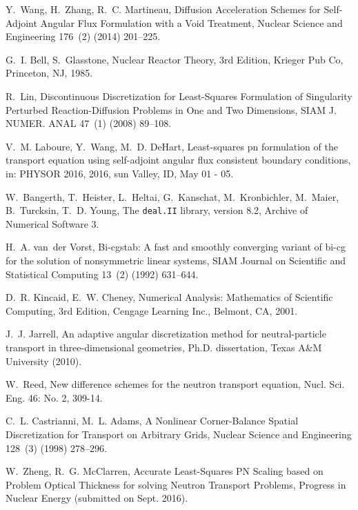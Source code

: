\documentclass[review]{elsarticle}
\begin{document}
\begin{thebibliography}{10}
	Y.~Wang, H.~Zhang, R.~C. Martineau, {Diffusion Acceleration Schemes for
		Self-Adjoint Angular Flux Formulation with a Void Treatment}, Nuclear Science
	and Engineering 176~(2) (2014) 201--225.
	
	G.~I. Bell, S.~Glasstone, Nuclear Reactor Theory, 3rd Edition, Krieger Pub Co,
	Princeton, NJ, 1985.
	
	R.~Lin, {Discontinuous Discretization for Least-Squares Formulation of
		Singularity Perturbed Reaction-Diffusion Problems in One and Two Dimensions},
	SIAM J. NUMER. ANAL 47~(1) (2008) 89--108.
	
	V.~M. Laboure, Y.~Wang, M.~D. DeHart, Least-squares pn formulation of the
	transport equation using self-adjoint angular flux consistent boundary
	conditions, in: {PHYSOR 2016}, 2016, sun Valley, ID, May 01 - 05.
	
	W.~Bangerth, T.~Heister, L.~Heltai, G.~Kanschat, M.~Kronbichler, M.~Maier,
	B.~Turcksin, T.~D. Young, The \texttt{deal.II} library, version 8.2, Archive
	of Numerical Software 3.
	
	H.~A. van~der Vorst, Bi-cgstab: A fast and smoothly converging variant of bi-cg
	for the solution of nonsymmetric linear systems, SIAM Journal on Scientific
	and Statistical Computing 13~(2) (1992) 631--644.
	
	D.~R. Kincaid, E.~W. Cheney, {Numerical Analysis: Mathematics of Scientific
		Computing}, 3rd Edition, Cengage Learning Inc., Belmont, CA, 2001.
	
	J.~J. Jarrell, An adaptive angular discretization method for neutral-particle
	transport in three-dimensional geometries, Ph.D. dissertation, Texas A\&M
	University (2010).
	
	W.~Reed, New difference schemes for the neutron transport equation, Nucl. Sci.
	Eng. 46: No. 2, 309-14.
	
	C.~L. Castrianni, M.~L. Adams, {A Nonlinear Corner-Balance Spatial
		Discretization for Transport on Arbitrary Grids}, Nuclear Science and
	Engineering 128~(3) (1998) 278--296.
	
	W.~Zheng, R.~G. McClarren, {Accurate Least-Squares PN Scaling based on Problem
		Optical Thickness for solving Neutron Transport Problems}, Progress in
	Nuclear Energy (submitted on Sept. 2016).
	

\end{thebibliography}
\end{document}
